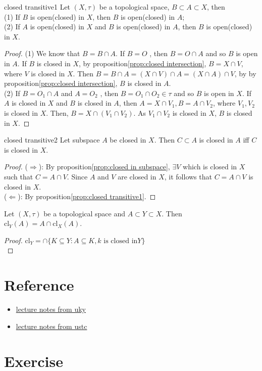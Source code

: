 \begin{proposition}{}{closed transitive1}
    Let $(X,\tau)$ be a topological space, $B\subset A\subset X$, then\\
    (1) If $B$ is open(closed) in $X$, then $B$ is open(closed) in $A$;\\
    (2) If $A$ is open(closed) in $X$ and $B$ is open(closed) in $A$, then $B$ is open(closed) in $X$.
\end{proposition}
\begin{proof}
    (1) We know that $B=B\cap A$. If $B=O$ , then $B = O\cap A$ and so $B$ is open in $A$. 
    If $B$ is closed in $X$, by proposition\ref{prop:closed intersection}, $B=X\cap V$, where $V$ is closed in $X$. 
    Then $B=B\cap A = (X\cap V)\cap A = (X\cap A)\cap V$, by by proposition\ref{prop:closed intersection}, $B$ is closed in $A$.\\
    (2) If $B = O_1\cap A$ and $A=O_2$ , then $B=O_1\cap O_2\in \tau$ and so $B$ is open in $X$.
    If $A$ is closed in $X$ and $B$ is closed in $A$, then $A = X\cap V_1, B=A\cap V_2$, where $V_1,V_2$ is closed in $X$.
    Then, $B = X\cap (V_1\cap V_2)$. As $V_1\cap V_2$ is closed in $X$, $B$ is closed in $X$. 
\end{proof}

\begin{corollary}{}{closed transitive2}
    Let subspace $A$ be closed in $X$. Then 
    $C\subset A$ is closed in $A$ iff $C$ is closed in $X$.
\end{corollary}
\begin{proof}
    ($\Rightarrow$): By proposition\ref{prop:closed in subspace}, $\exists V$ which is closed in $X$ such that $C=A\cap V$.
    Since $A$ and $V$ are closed in $X$, it follows that $C=A\cap V$ is closed in $X$.
    \\
    ($\Leftarrow$): By proposition\ref{prop:closed transitive1}.
\end{proof}

\begin{proposition}{}{}
    Let $(X,\tau)$ be a topological space and $A\subset Y\subset X$. Then $\text{cl}_Y(A)=A\cap \text{cl}_X(A)$.
\end{proposition}

\begin{proof}
    $\text{cl}_Y=\cap \{K\subseteq Y:A\subseteq K, k \text{ is closed in} Y\}$\\
    
\end{proof}

\section{Reference}
\begin{itemize}
    \item \href{https://www.ms.uky.edu/~guillou/F14/551Notes-Week4.pdf}{lecture notes from uky}
    \item \href{http://staff.ustc.edu.cn/~wangzuoq/Courses/21S-Topology/Notes/Lec07.pdf}{lecture notes from ustc}
\end{itemize}
\section{Exercise}

